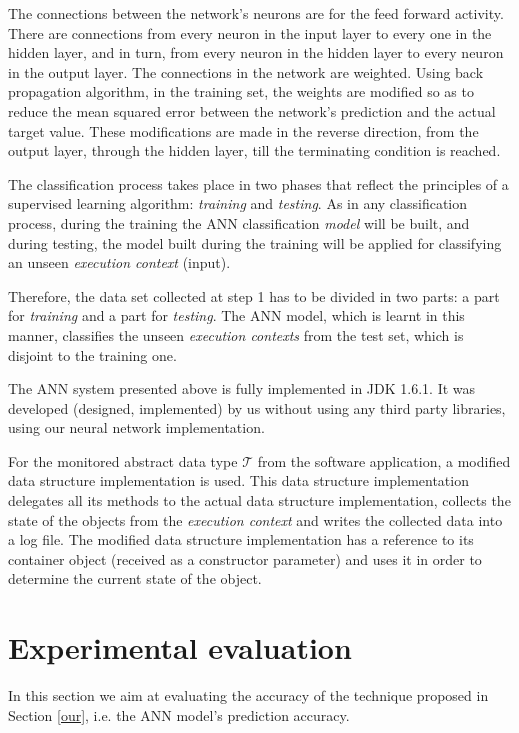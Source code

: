 The connections between the network's neurons are for the feed forward activity. There are
connections from every neuron in the input layer to every one in the hidden layer, and in turn, from every neuron in the hidden layer to every neuron in
the output layer. The connections in the network are weighted. Using back
propagation algorithm, in the training set, the weights are
modified so as to reduce the mean squared error between the network's prediction and the actual target value.
These modifications are made in the reverse direction, from
the output layer, through the hidden layer, till the terminating condition is reached.

The classification process takes place in two phases that reflect the principles of a supervised learning algorithm: \emph{training} and \emph{testing}. As in any classification process, during the training the ANN  classification \emph{model} will be built, and during testing, the model built during the training will be applied for classifying an unseen \emph{execution context} (input).

Therefore, the data set collected at step 1 has to be divided in two
parts: a part for \emph{training} and a part for \emph{testing}. The ANN model, which
is learnt in this manner, classifies the unseen \emph{execution contexts} from
the test set, which is disjoint to the training one.


The ANN system presented above is fully implemented in JDK 1.6.1. It was developed (designed, implemented) by us without using any third party libraries, using our neural network implementation.

For the monitored abstract data type $\mathcal{T}$ from the software application, a modified data structure implementation is used. This data structure implementation delegates all its methods to the actual data structure implementation, collects the state of the objects from the \emph{execution context} and writes the collected data into a log file. The modified data structure implementation has a reference to its container object (received as a constructor parameter) and uses it in order to determine the current state of the object.

\section{Experimental evaluation} \label{exp}

In this section we aim at evaluating the accuracy of the technique proposed in Section \ref{our}, i.e. the ANN model's prediction accuracy.

